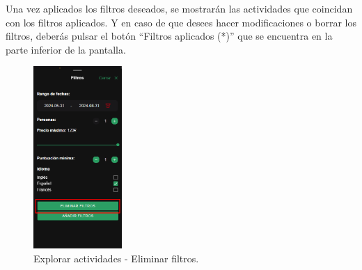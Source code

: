 Una vez aplicados los filtros deseados, se mostrarán las actividades que coincidan con los filtros aplicados.
Y en caso de que desees hacer modificaciones o borrar los filtros, deberás pulsar el botón “Filtros aplicados (*)” que se encuentra en la parte inferior de la pantalla.
\begin{figure}[H]
	\centering
	\includegraphics[width=0.3\textwidth]{7-Construccion/Manuales/mobile/eliminar filtros.png}
	\caption{Explorar actividades - Eliminar filtros.}
\end{figure}


